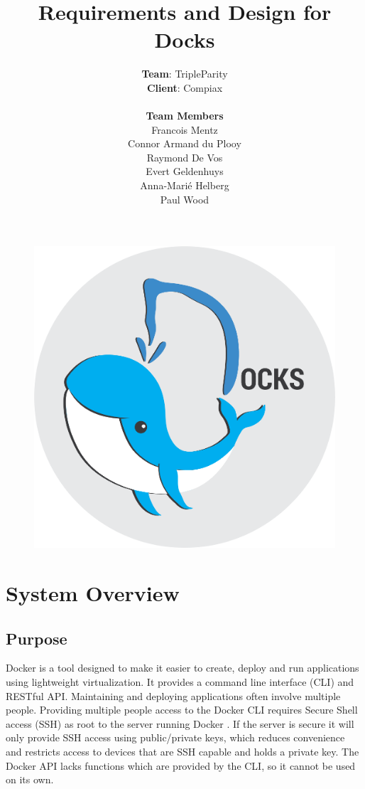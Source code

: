 \documentclass[]{article}
\title{\vspace{-1.2cm}Requirements and Design for Docks}
\author{\textbf{Team}: TripleParity\\
\textbf{Client}: Compiax\\
\\
\textbf{Team Members}\\
Francois Mentz\\
Connor Armand du Plooy\\
Raymond De Vos\\
Evert Geldenhuys\\
Anna-Marié Helberg\\
Paul Wood}
\date{}
\newcommand{\docker}{Docker }
\begin{document}
\begin{figure}[]
	\includegraphics[scale=0.7]{docks_round_512.png}
	\centering
\end{figure}

\maketitle

\tableofcontents

\pagebreak

\section{System Overview}
\subsection{Purpose}

\docker is a tool designed to make it easier to create, deploy and run applications
using lightweight virtualization. It provides a command line interface (CLI)
and RESTful API. Maintaining and deploying applications often involve multiple
people. Providing multiple people access to the \docker CLI requires
Secure Shell access (SSH) as root to the server running \docker. If the server
is secure it will only provide SSH access using public/private keys, which
reduces convenience and restricts access to devices that are SSH capable and
holds a private key. The \docker API lacks functions which are provided by
the CLI, so it cannot be used on its own.
\end{document}
